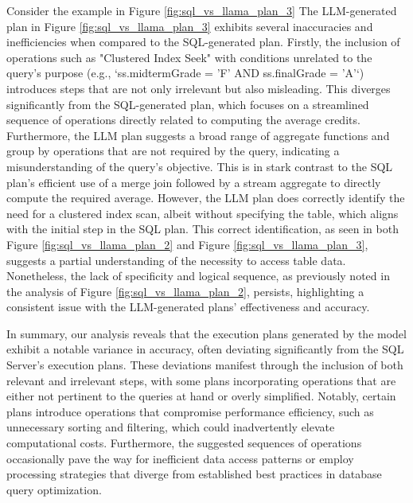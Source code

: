 Consider the example in Figure \ref{fig:sql_vs_llama_plan_3} The LLM-generated plan in Figure \ref{fig:sql_vs_llama_plan_3} exhibits several inaccuracies and inefficiencies when compared to the SQL-generated plan. Firstly, the inclusion of operations such as "Clustered Index Seek" with conditions unrelated to the query's purpose (e.g., `ss.midtermGrade = 'F' AND ss.finalGrade = 'A'`) introduces steps that are not only irrelevant but also misleading. This diverges significantly from the SQL-generated plan, which focuses on a streamlined sequence of operations directly related to computing the average credits. Furthermore, the LLM plan suggests a broad range of aggregate functions and group by operations that are not required by the query, indicating a misunderstanding of the query's objective. This is in stark contrast to the SQL plan's efficient use of a merge join followed by a stream aggregate to directly compute the required average. However, the LLM plan does correctly identify the need for a clustered index scan, albeit without specifying the table, which aligns with the initial step in the SQL plan. This correct identification, as seen in both Figure \ref{fig:sql_vs_llama_plan_2} and Figure \ref{fig:sql_vs_llama_plan_3}, suggests a partial understanding of the necessity to access table data. Nonetheless, the lack of specificity and logical sequence, as previously noted in the analysis of Figure \ref{fig:sql_vs_llama_plan_2}, persists, highlighting a consistent issue with the LLM-generated plans' effectiveness and accuracy.

In summary, our analysis reveals that the execution plans generated by the model exhibit a notable variance in accuracy, often deviating significantly from the SQL Server's execution plans. These deviations manifest through the inclusion of both relevant and irrelevant steps, with some plans incorporating operations that are either not pertinent to the queries at hand or overly simplified. Notably, certain plans introduce operations that compromise performance efficiency, such as unnecessary sorting and filtering, which could inadvertently elevate computational costs. Furthermore, the suggested sequences of operations occasionally pave the way for inefficient data access patterns or employ processing strategies that diverge from established best practices in database query optimization.

